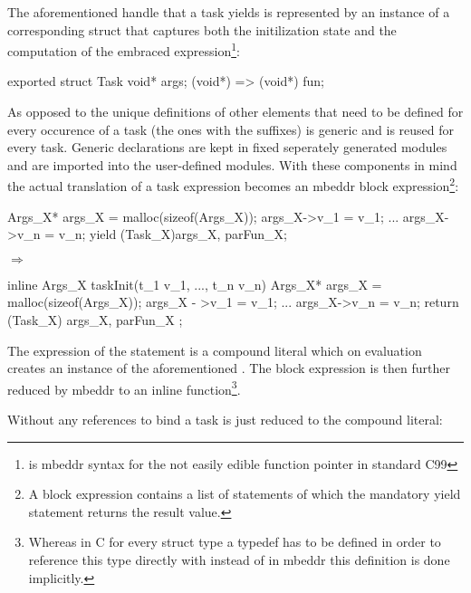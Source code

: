 The aforementioned handle that a task yields is represented by an instance of a corresponding struct that captures both the initilization state and the computation of the embraced expression\footnote{ is mbeddr syntax for the not easily edible function pointer  in standard C99}:
\begin{ccode}
exported struct Task {
  void* args;
  (void*) => (void*) fun;
}
\end{ccode}

As opposed to the unique definitions of other elements that need to be defined for every occurence of a task (the ones with the  suffixes)  is generic and is reused for every task. Generic declarations are kept in fixed seperately generated modules and are imported into the user-defined modules.
With these components in mind the actual translation of a task expression becomes an mbeddr block expression\footnote{A block expression contains a list of statements of which the mandatory yield statement returns the result value.}:

\begin{minipage}{0.4\textwidth}
\begin{ccode}
{
  Args_X* args_X = malloc(sizeof(Args_X));
  args_X->v_1 = v_1;
  ...
  args_X->v_n = v_n;
  yield (Task_X){args_X, parFun_X};
}
\end{ccode}
\end{minipage}
\begin{minipage}{0.2\textwidth}
$\Longrightarrow$
\end{minipage}
\begin{minipage}{0.4\textwidth}
\begin{ccode}
inline Args_X taskInit(t_1 v_1, ..., t_n v_n) {
  Args_X* args_X = malloc(sizeof(Args_X));
  args_X - >v_1 = v_1;
  ...
  args_X->v_n = v_n;
  return (Task_X){ args_X, parFun_X };
}
\end{ccode}
\end{minipage}

The expression of the  statement is a compound literal which on evaluation creates an instance of the aforementioned . The block expression is then further reduced by mbeddr to an inline function\footnote{Whereas in C for every struct type  a typedef has to be defined in order to reference this type directly with  instead of  in mbeddr this definition is done implicitly.}.

Without any references to bind a task is just reduced to the compound literal:

